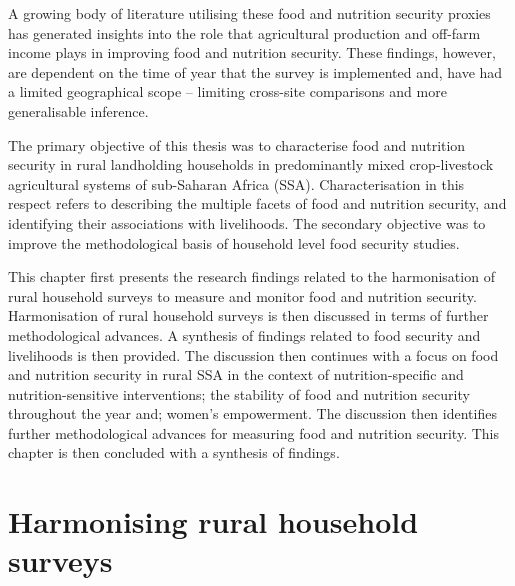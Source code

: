 A growing body of literature utilising these food and nutrition security proxies has generated insights into the role that agricultural production and off-farm income plays in improving food and nutrition security. These findings, however, are dependent on the time of year that the survey is implemented and, have had a limited geographical scope -- limiting cross-site comparisons and more generalisable inference.

The primary objective of this thesis was to characterise food and nutrition security in rural landholding households in predominantly mixed crop-livestock agricultural systems of sub-Saharan Africa (SSA). Characterisation in this respect refers to describing the multiple facets of food and nutrition security, and identifying their associations with livelihoods. The secondary objective was to improve the methodological basis of household level food security studies.

This chapter first presents the research findings related to the harmonisation of rural household surveys to measure and monitor food and nutrition security. Harmonisation of rural household surveys is then discussed in terms of further methodological advances. A synthesis of findings related to food security and livelihoods is then provided. The discussion then continues with a focus on food and nutrition security in rural SSA in the context of nutrition-specific and nutrition-sensitive interventions; the stability of food and nutrition security throughout the year and; women's empowerment. The discussion then identifies further methodological advances for measuring food and nutrition security. This chapter is then concluded with a synthesis of findings.

\section{Harmonising rural household surveys}
